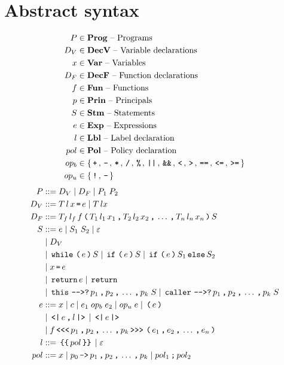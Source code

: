 \section{Abstract syntax}

\begin{align*}
  P       & \in \mathbf{Prog} \text{ -- Programs}\\
  D_V     & \in \mathbf{DecV} \text{ -- Variable declarations}\\
  x       & \in \mathbf{Var} \text{ -- Variables}\\
  D_F     & \in \mathbf{DecF} \text{ -- Function declarations}\\
  f       & \in \mathbf{Fun} \text{ -- Functions}\\
  p       & \in \mathbf{Prin} \text{ -- Principals}\\
  S       & \in \mathbf{Stm} \text{ -- Statements}\\
  e       & \in \mathbf{Exp} \text{ -- Expressions}\\
  l       & \in \mathbf{Lbl} \text{ -- Label declaration}\\
  pol     & \in \mathbf{Pol} \text{ -- Policy declaration}\\
  op_b    & \in \{ \, \texttt{+} \, ,  \, \texttt{-} \, ,  \, \texttt{*} \, ,  \, \texttt{/} \, ,  \, \texttt{\%} \, ,  \, \texttt{||} \, ,  \, \texttt{\&\&} \, ,  \, \texttt{<} \, ,  \, \texttt{>} \, ,  \, \texttt{==} \, ,  \, \texttt{<=} \, ,  \, \texttt{>=} \, \} \\
  op_u    & \in \{ \, \texttt{!} \, ,  \, \texttt{-} \, \}
\end{align*}
\begin{align*}
  P         & ::= D_V \gp D_F \gp P_1 \; P_2 \\
  D_V       & ::= T \, l \, x \tk = e \gp T \, l x \\
  D_F       & ::= T_f \, l_f \, f \tk ( T_1 \, l_1 \, x_1 \tk , T_2 \, l_2 \, x_2 \tk , \dots \tk , T_n \, l_n \, x_n \tk ) S \\
  S         & ::= e \gp S_1 \; S_2 \gp \varepsilon \\
            & \gp D_V \\
            & \gp \tk{while} \tk ( e \tk ) S \gp \tk{if} \tk ( e \tk ) S \gp \tk{if} \tk ( e \tk ) S_1 \tk{else} S_2 \\
            & \gp x \tk = e \\
            & \gp \tk{return} e \gp \tk{return} \\
            & \gp \tk{this} \tk{-{}->?} p_1 \tk , p_2 \tk , \dots \tk , p_k \; S \gp \tk{caller} \tk{-{}->?} p_1 \tk , p_2 \tk , \dots \tk , p_k \; S \\
  e         & ::= x \gp c \gp e_1 \; op_b \; e_2 \gp op_u \; e \gp \tk ( e \tk ) \\
            & \gp \tk{<|} e \tk , l \tk{|>} \gp \tk{<|} e \tk{|>} \\
            & \gp f \tk{<{}<{}<} p_1 \tk , p_2 \tk , \dots \tk , p_k \tk{>{}>{}>} \tk ( e_1 \tk , e_2 \tk , \dots \tk , e_n \tk ) \\
  l         & ::= \tk{\{\{} pol \tk{\}\}} \gp \varepsilon \\
  pol       & ::= x \gp p_0 \tk{->} p_1 \tk , p_2 \tk , \dots \tk , p_k \gp pol_1 \tk ; pol_2
\end{align*}
